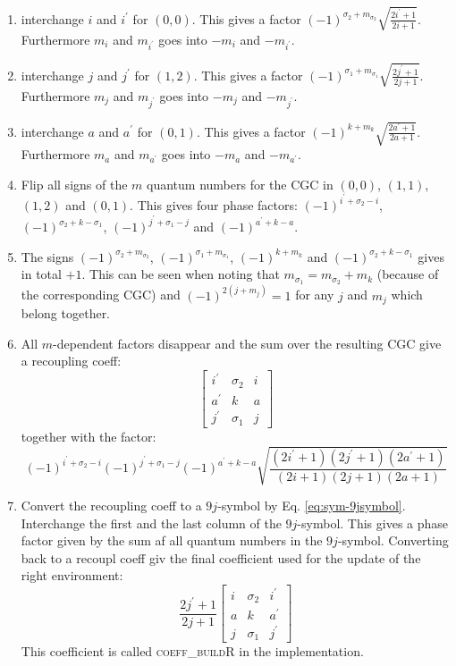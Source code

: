 \documentclass[a4paper,10pt,parskip=full]{scrartcl}
\begin{document}
\begin{enumerate}
\item
  interchange $i$ and $i^\prime$ for $(0,0)$. This gives a factor
  $(-1)^{\sigma_2+m_{\sigma_2}}\sqrt{\frac{2i^\prime+1}{2i+1}}$.
  Furthermore $m_{i}$ and $m_{i^\prime}$  goes into $-m_{i}$ and $-m_{i^\prime}$.
\item
  interchange $j$ and $j^\prime$ for $(1,2)$. This gives a factor
  $(-1)^{\sigma_1+m_{\sigma_1}}\sqrt{\frac{2j^\prime+1}{2j+1}}$.
  Furthermore $m_{j}$ and $m_{j^\prime}$  goes into $-m_{j}$ and $-m_{j^\prime}$.
\item
  interchange $a$ and $a^\prime$ for $(0,1)$. This gives a factor
  $(-1)^{k+m_{k}}\sqrt{\frac{2a^\prime+1}{2a+1}}$.
  Furthermore $m_{a}$ and $m_{a^\prime}$  goes into $-m_{a}$ and $-m_{a^\prime}$.
\item
  Flip all signs of the $m$ quantum numbers for the CGC in $(0,0)$, $(1,1)$, $(1,2)$ and $(0,1)$.
  This gives four phase factors: $(-1)^{i^\prime+\sigma_2-i}$, $(-1)^{\sigma_2+k-\sigma_1}$, $(-1)^{j^\prime+\sigma_1-j}$ and $(-1)^{a^\prime+k-a}$.
\item
  The signs $(-1)^{\sigma_2+m_{\sigma_2}}$, $(-1)^{\sigma_1+m_{\sigma_1}}$, $(-1)^{k+m_{k}}$ and $(-1)^{\sigma_2+k-\sigma_1}$
  gives in total $+1$. This can be seen when noting that $m_{\sigma_1}=m_{\sigma_2}+m_k$ (because of the corresponding CGC) and $(-1)^{2(j+m_j)}=1$
  for any $j$ and $m_j$ which belong together.
\item
  All $m$-dependent factors disappear and the sum over the resulting CGC give a recoupling coeff:
  \begin{equation}
    \begin{bmatrix}
      i^\prime & \sigma_2 & i \\
      a^\prime & k & a \\
      j^\prime & \sigma_1 &j
  \end{bmatrix}
\end{equation}
together with the factor:
\begin{equation}
  (-1)^{i^\prime+\sigma_2-i}(-1)^{j^\prime+\sigma_1-j}(-1)^{a^\prime+k-a}\sqrt{\frac{(2i^\prime+1)(2j^\prime+1)(2a^\prime+1)}{(2i+1)(2j+1)(2a+1)}}
\end{equation}
\item
  Convert the recoupling coeff to a $9j$-symbol by Eq. \eqref{eq:sym-9jsymbol}.
  Interchange the first and the last column of the $9j$-symbol. This gives a phase factor given by the sum af all
  quantum numbers in the $9j$-symbol. Converting back to a recoupl coeff giv the final coefficient used for
  the update of the right environment:
  \begin{equation}
    \frac{2j^\prime+1}{2j+1}
    \begin{bmatrix}
      i & \sigma_2 & i^\prime \\
      a & k & a^\prime \\
      j & \sigma_1 &j^\prime
    \end{bmatrix}
  \end{equation}
  This coefficient is called \textsc{coeff\_buildR} in the implementation.
\end{enumerate}
\end{document}
